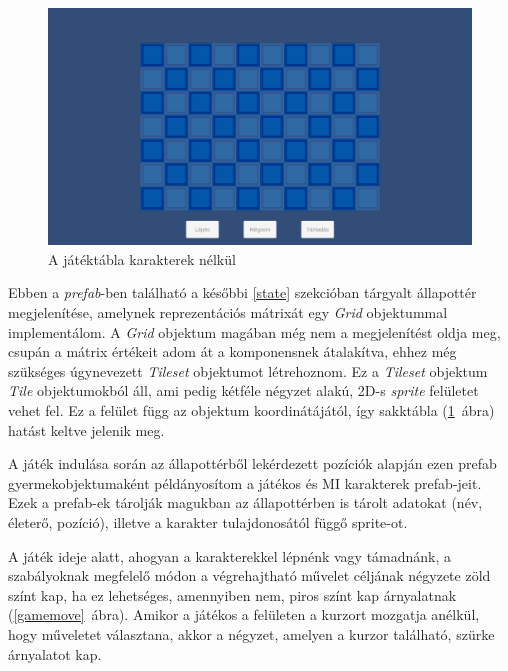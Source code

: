 \documentclass[
]{thesis-ekf}
\theoremstyle{definition}
\theoremstyle{remark}
\begin{document}
\begin{figure}[h!]
	\centering
	\includegraphics[width=15cm]{./pictures/game_grid.png}
	\caption{A játéktábla karakterek nélkül}
	\label{gamegrid}
\end{figure}

Ebben a \emph{prefab}-ben található a későbbi \ref{state} szekcióban tárgyalt állapottér megjelenítése, amelynek reprezentációs mátrixát egy \emph{Grid} objektummal implementálom. A \emph{Grid} objektum magában még nem a megjelenítést oldja meg, csupán a mátrix értékeit adom át a komponensnek átalakítva, ehhez még szükséges úgynevezett \emph{Tileset} objektumot létrehoznom. Ez a \emph{Tileset} objektum \emph{Tile} objektumokból áll, ami pedig kétféle négyzet alakú, 2D-s \emph{sprite} felületet vehet fel. Ez a felület függ az objektum koordinátájától, így sakktábla (\ref{gamegrid}~ábra) hatást keltve jelenik meg. 

A játék indulása során az állapottérből lekérdezett pozíciók alapján ezen prefab gyermekobjektumaként példányosítom a játékos és MI karakterek prefab-jeit. Ezek a prefab-ek tárolják magukban az állapottérben is tárolt adatokat (név, életerő, pozíció), illetve a karakter tulajdonosától függő sprite-ot.

A játék ideje alatt, ahogyan a karakterekkel lépnénk vagy támadnánk, a szabályoknak megfelelő módon a végrehajtható művelet céljának négyzete zöld színt kap, ha ez lehetséges, amennyiben nem, piros színt kap árnyalatnak (\ref{gamemove}~ábra). Amikor a játékos a felületen a kurzort mozgatja anélkül, hogy műveletet választana, akkor a négyzet, amelyen a kurzor található, szürke árnyalatot kap.
\end{document}

